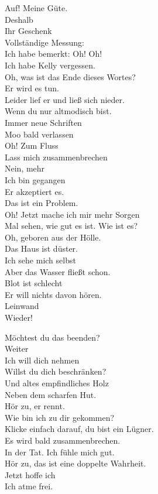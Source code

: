 {Auf! Meine Güte. \\
Deshalb \\
Ihr Geschenk \\
Vollständige Messung: \\
Ich habe bemerkt: Oh! Oh! \\
Ich habe Kelly vergessen. \\

Oh, was ist das Ende dieses Wortes? \\
Er wird es tun. \\
Leider lief er und ließ sich nieder. \\
Wenn du nur altmodisch bist. \\
Immer neue Schriften \\
Moo bald verlassen \\
Oh! Zum Fluss \\
Lass mich zusammenbrechen \\

Nein, mehr \\
Ich bin gegangen \\
Er akzeptiert es.\\
Das ist ein Problem. \\
Oh! Jetzt mache ich mir mehr Sorgen \\
Mal sehen, wie gut es ist. Wie ist es? \\

Oh, geboren aus der Hölle. \\
Das Haus ist düster. \\
Ich sehe mich selbst \\
Aber das Wasser fließt schon. \\
Blot ist schlecht \\
Er will nichts davon hören. \\
Leinwand \\
Wieder!

Möchtest du das beenden? \\
Weiter \\
Ich will dich nehmen \\
Willst du dich beschränken? \\
Und altes empfindliches Holz \\
Neben dem scharfen Hut. \\

Hör zu, er rennt. \\
Wie bin ich zu dir gekommen? \\
Klicke einfach darauf, du bist ein Lügner. \\
Es wird bald zusammenbrechen. \\
In der Tat. Ich fühle mich gut. \\
Hör zu, das ist eine doppelte Wahrheit. \\
Jetzt hoffe ich \\
Ich atme frei. \\

}
